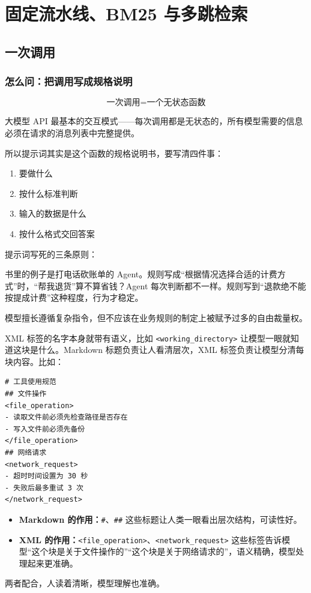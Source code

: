 \chapter{固定流水线、BM25 与多跳检索}

\section{一次调用}

\subsection{怎么问：把调用写成规格说明}
\[\text{一次调用} = \text{一个无状态函数}\]

大模型 API 最基本的交互模式——每次调用都是无状态的，所有模型需要的信息必须在请求的消息列表中完整提供。

所以提示词其实是这个函数的规格说明书，要写清四件事：
\begin{enumerate}
  \item 要做什么
  \item 按什么标准判断
  \item 输入的数据是什么
  \item 按什么格式交回答案
\end{enumerate}

提示词写死的三条原则：

书里的例子是打电话砍账单的 Agent。规则写成“根据情况选择合适的计费方式”时，“帮我退货”算不算省钱？Agent 每次判断都不一样。规则写到“退款绝不能按提成计费”这种程度，行为才稳定。

\begin{tcolorbox}[enhanced, sharp corners, boxrule=0pt, frame hidden,
                  borderline west={3pt}{0pt}{structurecolor},
                  colback=structurecolor!5]
    模型擅长遵循复杂指令，但不应该在业务规则的制定上被赋予过多的自由裁量权。
\end{tcolorbox}

XML 标签的名字本身就带有语义，比如 \texttt{<working\_directory>} 让模型一眼就知道这块是什么。Markdown 标题负责让人看清层次，XML 标签负责让模型分清每块内容。比如：
\begin{lstlisting}[style=agenttext]
# 工具使用规范
## 文件操作
<file_operation>
- 读取文件前必须先检查路径是否存在
- 写入文件前必须先备份
</file_operation>
## 网络请求
<network_request>
- 超时时间设置为 30 秒
- 失败后最多重试 3 次
</network_request>
\end{lstlisting}
\begin{itemize}
  \item \textbf{Markdown 的作用：}\texttt{\#}、\texttt{\#\#} 这些标题让人类一眼看出层次结构，可读性好。
  \item \textbf{XML 的作用：}\texttt{<file\_operation>}、\texttt{<network\_request>} 这些标签告诉模型“这个块是关于文件操作的”“这个块是关于网络请求的”，语义精确，模型处理起来更准确。
\end{itemize}
两者配合，人读着清晰，模型理解也准确。

